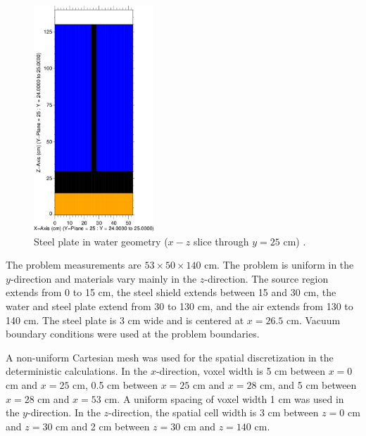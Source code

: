 \documentclass{article} %
\begin{document}
\begin{figure}[!htb]
\centering
\includegraphics[width=0.4\textwidth]{steel-xz.png}
\caption{Steel plate in water geometry ($x-z$ slice through $y = 25$ cm) 
         \cite{wilsonslaybaugh}.}
\label{steelxz}
\end{figure}

The problem measurements are $53\times50\times140$ cm. The problem is uniform 
in the $y$-direction and materials vary mainly in the $z$-direction. The source
region extends from 0 to 15 cm, the steel shield extends between 15 and 30 cm, 
the water and steel plate extend from 30 to 130 cm, and the air extends from 
130 to 140 cm. The steel plate is 3 cm wide and is centered at $x = 26.5$ cm. 
Vacuum boundary conditions were used at the problem boundaries.

A non-uniform Cartesian mesh was used for the spatial discretization in the 
deterministic calculations. In the $x$-direction, voxel width is 5 cm between
$x = 0$ cm and $x = 25$ cm, 0.5 cm between $x = 25$ cm and $x = 28$ cm, and 5 
cm between $x = 28$ cm and $x = 53$ cm. A uniform spacing of voxel width 1 cm 
was used in the $y$-direction. In the $z$-direction, the spatial cell width is
3 cm between $z = 0$ cm and $z = 30$ cm and 2 cm between $z = 30$ cm and 
$z = 140$ cm.
\end{document}
